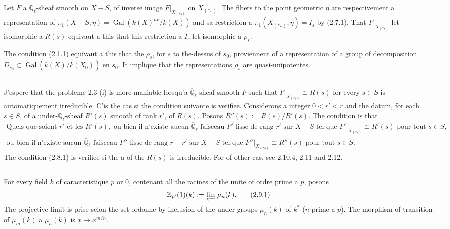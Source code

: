 \documentclass[11pt,a4paper]{article}
\theoremstyle{plain}
\theoremstyle{definition}
\DeclareMathOperator{\Gal}{Gal}
\newcommand{\Z}{\mathbb{Z}}
\newcommand{\Ql}{\overline{\mathbb{Q}}_\ell}
\begin{document}
Let $F$ a $\Ql$-sheaf smooth on $X - S$, of inverse image $F|_{X_{(*s)}}$ on $X_{(*s)}$. The fibers to the point geometric $\overline{\eta}$ are respectivement a representation of $\pi_1(X - S, \overline{\eta}) = \Gal(k(X)^{nr}/k(X))$ and sa restriction a $\pi_1(X_{(*s)}, \overline{\eta}) = I_s$ by (2.7.1). That $F|_{X_{(*s)}}$ let isomorphic a $R(s)$ equivaut a this that this restriction a $I_s$ let isomorphic a $\rho_s$.

The condition (2.1.1) equivaut a this that the $\rho_s$, for $s$ to the-dessus of $s_0$, proviennent of a representation of a group of decomposition $D_{s_0} \subset \Gal(\overline{k(X)}/k(X_0))$ en $s_0$. It implique that the representations $\rho_s$ are quasi-unipotentes.

\subsection{}
J'espere that the probleme 2.3 (i) is more maniable lorsqu'a $\Ql$-sheaf smooth $F$ such that $F|_{X_{(*s)}} \cong R(s)$ for every $s \in S$ is automatiquement irreducible. C'is the cas si the condition suivante is verifiee. Considerons a integer $0 < r' < r$ and the datum, for each $s \in S$, of a under-$\Ql$-sheaf $R'(s)$ smooth of rank $r'$, of $R(s)$. Posons $R''(s) := R(s)/R'(s)$. The condition is that
\begin{multline}
\text{Quels que soient } r' \text{ et les } R'(s), \text{ ou bien il n'existe aucun } \Ql\text{-faisceau } F' \text{ lisse de rang } r' \text{ sur } X - S \text{ tel que } F'|_{X_{(*s)}} \cong R'(s) \text{ pour tout } s \in S, \\ \text{ou bien il n'existe aucun } \Ql\text{-faisceau } F'' \text{ lisse de rang } r - r' \text{ sur } X - S \text{ tel que } F''|_{X_{(*s)}} \cong R''(s) \text{ pour tout } s \in S.
\tag{2.8.1}
\end{multline}
The condition (2.8.1) is verifiee si the a of the $R(s)$ is irreducible. For of other cas, see 2.10.4, 2.11 and 2.12.

\subsection{}
For every field $k$ of caracteristique $p$ or $0$, contenant all the racines of the unite of ordre prime a $p$, posons
\begin{equation}
\Z_{p'}(1)(k) := \varprojlim \mu_n(k).
\tag{2.9.1}
\end{equation}
The projective limit is prise selon the set ordonne by inclusion of the under-groups $\mu_n(k)$ of $k^*$ ($n$ prime a $p$). The morphism of transition of $\mu_m(k)$ a $\mu_n(k)$ is $x \mapsto x^{m/n}$.
\end{document}

